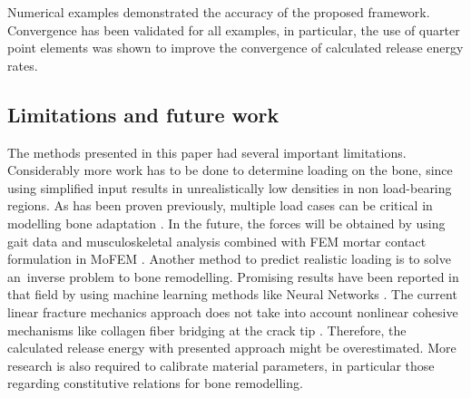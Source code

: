 \documentclass[11pt]{acmeArticle}
\numberwithin{equation}{section}
\begin{document}
Numerical examples demonstrated the accuracy of the proposed framework. Convergence has been validated for all examples, in particular, the use of quarter point elements was shown to improve the convergence of calculated release energy rates. 
\subsection{Limitations and future work}
The methods presented in this paper had several important limitations. Considerably more work has to be done to determine loading on the bone, since using simplified input results in unrealistically low densities in non load-bearing regions. As has been proven previously, multiple load cases can be critical in modelling bone adaptation \citep{geraldes2016consideration}. In the future, the forces will be obtained by using gait data and musculoskeletal analysis \citep{Delp2007} combined with FEM mortar contact formulation in MoFEM \citep{athanasiadis2018mortar}. Another method to predict realistic loading is to solve an~inverse problem to bone remodelling. Promising results have been reported in that field by using machine learning methods like Neural Networks \citep{campoli2012computational}. The current linear fracture mechanics approach does not take into account nonlinear cohesive mechanisms like collagen fiber bridging at the crack tip \citep{yang2006fracture}. Therefore, the calculated release energy with presented approach might be overestimated. More research is also required to calibrate material parameters, in particular those regarding constitutive relations for bone remodelling. 





\end{document}
